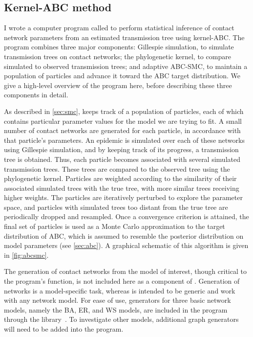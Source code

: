 \subsection{Kernel-ABC method}

I wrote a computer program called  to perform statistical
inference of contact network parameters from an estimated transmission tree
using kernel-\gls{ABC}. The program combines three major components: Gillespie
simulation, to simulate transmission trees on contact networks; the
phylogenetic kernel, to compare simulated to observed transmission trees; and
adaptive \gls{ABC}-\gls{SMC}, to maintain a population of particles and advance
it toward the \gls{ABC} target distribution. We give a high-level overview of
the program here, before describing these three components in detail.

As described in \cref{sec:smc},  keeps track of a population
of particles, each of which contains particular parameter values for the model
we are trying to fit. A small number of contact networks are generated for each
particle, in accordance with that particle's parameters. An epidemic is
simulated over each of these networks using Gillespie simulation, and by
keeping track of its progress, a transmission tree is obtained. Thus, each
particle becomes associated with several simulated transmission trees.  These
trees are compared to the observed tree using the phylogenetic kernel.
Particles are weighted according to the similarity of their associated
simulated trees with the true tree, with more similar trees receiving higher
weights. The particles are iteratively perturbed to explore the parameter
space, and particles with simulated trees too distant from the true tree are
periodically dropped and resampled. Once a convergence criterion is attained,
the final set of particles is used as a Monte Carlo approximation to the target
distribution of \gls{ABC}, which is assumed to resemble the posterior
distribution on model parameters (see \cref{sec:abc}). A graphical schematic of
this algorithm is given in \cref{fig:abcsmc}.

The generation of contact networks from the model of interest, though critical
to the program's function, is not included here as a component of
.  Generation of networks is a model-specific task, whereas
 is intended to be generic and work with any network model.
For ease of use, generators for three basic network models, namely the
\gls{BA}, \gls{ER}, and \gls{WS} models, are included in the program through
the  library~\autocite{csardi2006igraph}. To investigate other
models, additional graph generators will need to be added into the program.

